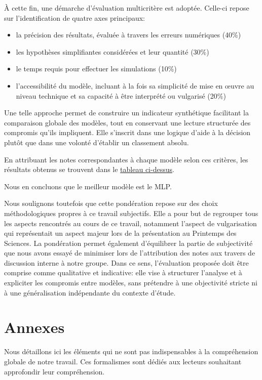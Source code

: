 \documentclass[
	a4paper, %
	10pt, %
	unnumberedsections, %
	twoside, %
]{LTJournalArticle}
\begin{document}
À cette fin, une démarche d’évaluation multicritère est adoptée. Celle-ci repose sur l’identification de quatre axes principaux:
\begin{itemize}
    \item la précision des résultats, évaluée à travers les erreurs numériques (40\%)
    \item les hypothèses simplifiantes considérées et leur quantité (30\%)
    \item le temps requis pour effectuer les simulations (10\%)
    \item l’accessibilité du modèle, incluant à la fois sa simplicité de mise en œuvre au
          niveau technique et sa capacité à être interprété ou vulgarisé (20\%)
\end{itemize}
Une telle approche permet de construire un indicateur synthétique facilitant la
comparaison globale des modèles, tout en conservant une lecture structurée des
compromis qu’ils impliquent. Elle s’inscrit dans une logique d’aide à la
décision plutôt que dans une volonté d’établir un classement absolu.

En attribuant les notes correspondantes à chaque modèle selon ces critères,
les résultats obtenus se trouvent dans le \hyperref[tab:multicritere]{tableau ci-dessus}.

Nous en concluons que le meilleur modèle est le MLP. 

Nous soulignons toutefois que cette 
pondération repose sur des choix méthodologiques propres à ce travail subjectifs. 
Elle a pour but de regrouper tous les aspects rencontrés au cours de ce travail, notamment
l'aspect de vulgarisation qui représentait un aspect majeur lors de la
présentation au Printemps des Sciences. La pondération permet également 
d'équilibrer la partie de subjectivité que nous avons
essayé de minimiser lors de l'attribution des notes aux travers de discussion interne à
notre groupe. Dans ce sens, l’évaluation proposée
doit être comprise comme qualitative et indicative: elle vise à structurer
l’analyse et à expliciter les compromis entre modèles, sans prétendre à une
objectivité stricte ni à une généralisation indépendante du contexte d’étude.


\clearpage


\appendix
\section{Annexes}
Nous détaillons ici les éléments qui ne sont pas indispensables à la compréhension 
globale de notre travail. Ces formalismes sont dédiés aux lecteurs souhaitant
approfondir leur compréhension.
\end{document}
